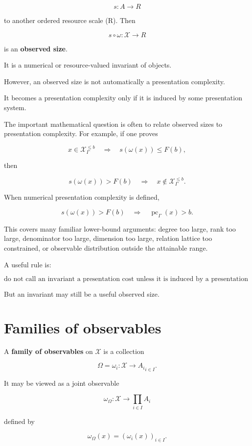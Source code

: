 \documentclass[11pt]{article}
\begin{document}
\[
s:A\to R
\]

to another ordered resource scale (R). Then

\[
s\circ\omega:\mathcal X\to R
\]

is an \textbf{observed size}.

It is a numerical or resource-valued invariant of objects.

However, an observed size is not automatically a presentation complexity.

It becomes a presentation complexity only if it is induced by some presentation system.

The important mathematical question is often to relate observed sizes to presentation complexity. For example, if one proves

\[
x\in\mathcal X_\Gamma^{\leq b}
\quad\Longrightarrow\quad
s(\omega(x))\leq F(b),
\]

then

\[
s(\omega(x))>F(b)
\quad\Longrightarrow\quad
x\notin\mathcal X_\Gamma^{\leq b}.
\]

When numerical presentation complexity is defined,

\[
s(\omega(x))>F(b)
\quad\Longrightarrow\quad
\operatorname{pc}_\Gamma(x)> b.
\]

This covers many familiar lower-bound arguments: degree too large, rank too large, denominator too large, dimension too large, relation lattice too constrained, or observable distribution outside the attainable range.

A useful rule is:

\[
\text{do not call an invariant a presentation cost unless it is induced by a presentation system.}
\]

But an invariant may still be a useful observed size.


\section{Families of observables}

A \textbf{family of observables} on \(\mathcal X\) is a collection

\[
\Omega={\omega_i:\mathcal X\to A_i}_{i\in I}.
\]

It may be viewed as a joint observable

\[
\omega_\Omega:\mathcal X\to \prod_{i\in I}A_i
\]

defined by

\[
\omega_\Omega(x)=(\omega_i(x))_{i\in I}.
\]
\end{document}
